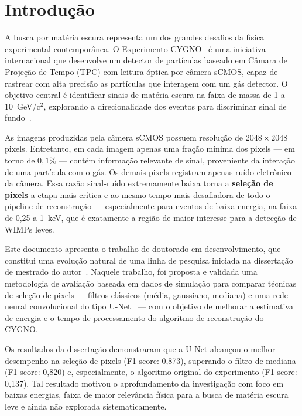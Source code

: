 \documentclass[
       oneside,
       english,
       brazil
       ]{abntbibufjf}
\begin{document}
\tableofcontents*
\cleardoublepage


\textual


\chapter{Introdução}
\label{chap:intro}

A busca por matéria escura representa um dos grandes desafios da física
experimental contemporânea. O Experimento CYGNO~\cite{bib:eps} é uma
iniciativa internacional que desenvolve um detector de partículas baseado em
Câmara de Projeção de Tempo (TPC) com leitura óptica por câmera sCMOS, capaz
de rastrear com alta precisão as partículas que interagem com um gás
detector. O objetivo central é identificar sinais de matéria escura na faixa
de massa de 1 a 10~GeV/c$^2$, explorando a direcionalidade dos eventos para
discriminar sinal de fundo~\cite{baracchini2020density}.

As imagens produzidas pela câmera sCMOS possuem resolução de
$2048 \times 2048$ pixels. Entretanto, em cada imagem apenas uma fração
mínima dos pixels — em torno de $0,1\%$ — contém informação relevante de
sinal, proveniente da interação de uma partícula com o gás. Os demais pixels
registram apenas ruído eletrônico da câmera. Essa razão sinal-ruído
extremamente baixa torna a \textbf{seleção de pixels} a etapa mais crítica e
ao mesmo tempo mais desafiadora de todo o pipeline de reconstrução —
especialmente para eventos de baixa energia, na faixa de 0,25 a 1~keV, que
é exatamente a região de maior interesse para a detecção de WIMPs leves.

Este documento apresenta o trabalho de doutorado em desenvolvimento, que
constitui uma evolução natural de uma linha de pesquisa iniciada na
dissertação de mestrado do autor~\cite{lopes2019study}. Naquele trabalho,
foi proposta e validada uma metodologia de avaliação baseada em dados de
simulação para comparar técnicas de seleção de pixels — filtros clássicos
(média, gaussiano, mediana) e uma rede neural convolucional do tipo
U-Net~\cite{ronneberger2015u} — com o objetivo de melhorar a estimativa de
energia e o tempo de processamento do algoritmo de reconstrução do CYGNO.

Os resultados da dissertação demonstraram que a U-Net alcançou o melhor
desempenho na seleção de pixels (F1-score: 0,873), superando o filtro de
mediana (F1-score: 0,820) e, especialmente, o algoritmo original do
experimento (F1-score: 0,137). Tal resultado motivou o aprofundamento da
investigação com foco em baixas energias, faixa de maior relevância física
para a busca de matéria escura leve e ainda não explorada sistematicamente.
\end{document}
